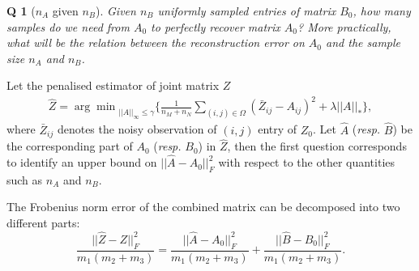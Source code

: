 \documentclass{article} %
\newtheorem{question}{Q}
\begin{document}

\begin{question}[$n_A$ given $n_B$]
Given $n_B$ uniformly sampled entries of matrix $B_0$, how many samples do we need from $A_0$ to perfectly recover matrix $A_0$? More practically, what will be the relation between the reconstruction error on $A_0$ and the sample size $n_A$ and $n_B$.
\end{question}
Let the penalised estimator of joint matrix $Z$
\begin{align}
\label{eqn:z_estimator}
\hat{Z} = {\arg\min}_{||{A}||_\infty \leq \gamma} \bigg\{\frac{1}{n_M + n_N} \sum_{(i,j) \in \Omega}(\bar{Z}_{ij} - {A}_{ij})^2 + \lambda ||{A}||_* \bigg\},
\end{align}
where $\bar{Z}_{ij}$ denotes the noisy observation of $(i,j)$ entry of $Z_0$. Let $\hat{A}$ (\textit{resp.} $\hat{B}$) be the corresponding part of $A_0$ (\textit{resp.} $B_0$) in $\hat{Z}$, then the first question corresponds to identify an upper bound on
$||\hat{A} - A_0||_F^2$
with respect to the other quantities such as $n_A$ and $n_B$.

The Frobenius norm error of the combined matrix can be decomposed into two different parts:
\begin{equation}
\label{eqn:decomp}
\frac{||\hat{Z} - Z||_F^2}{m_1(m_2+m_3)} = \frac{||\hat{A} - A_0||_F^2}{m_1(m_2+m_3)} + \frac{||\hat{B} - B_0||_F^2}{m_1(m_2+m_3)}.
\end{equation}

\end{document}
